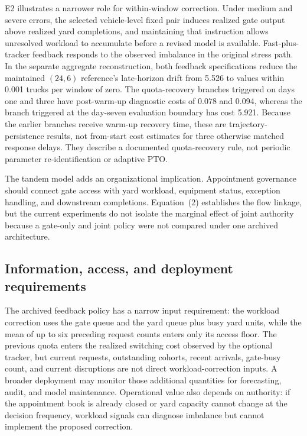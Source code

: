 \documentclass[preprint,12pt,authoryear,a4paper]{elsarticle}
\begin{document}
E2 illustrates a narrower role for within-window correction. Under medium and severe errors, the selected vehicle-level fixed pair induces realized gate output above realized yard completions, and maintaining that instruction allows unresolved workload to accumulate before a revised model is available. Fast-plus-tracker feedback responds to the observed imbalance in the original stress path. In the separate aggregate reconstruction, both feedback specifications reduce the maintained \((24,6)\) reference's late-horizon drift from 5.526 to values within 0.001 trucks per window of zero. The quota-recovery branches triggered on days one and three have post-warm-up diagnostic costs of 0.078 and 0.094, whereas the branch triggered at the day-seven evaluation boundary has cost 5.921. Because the earlier branches receive warm-up recovery time, these are trajectory-persistence results, not from-start cost estimates for three otherwise matched response delays. They describe a documented quota-recovery rule, not periodic parameter re-identification or adaptive PTO.

The tandem model adds an organizational implication. Appointment governance should connect gate access with yard workload, equipment status, exception handling, and downstream completions. Equation~(2) establishes the flow linkage, but the current experiments do not isolate the marginal effect of joint authority because a gate-only and joint policy were not compared under one archived architecture.

\subsection{Information, access, and deployment requirements}

The archived feedback policy has a narrow input requirement: the workload correction uses the gate queue and the yard queue plus busy yard units, while the mean of up to six preceding request counts enters only its access floor. The previous quota enters the realized switching cost observed by the optional tracker, but current requests, outstanding cohorts, recent arrivals, gate-busy count, and current disruptions are not direct workload-correction inputs. A broader deployment may monitor those additional quantities for forecasting, audit, and model maintenance. Operational value also depends on authority: if the appointment book is already closed or yard capacity cannot change at the decision frequency, workload signals can diagnose imbalance but cannot implement the proposed correction.
\end{document}
